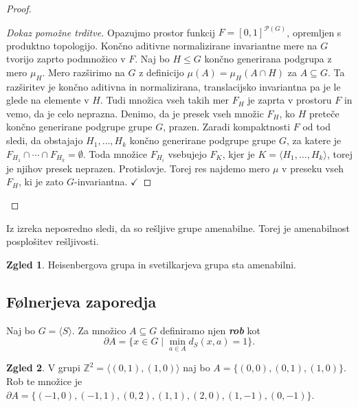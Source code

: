 \documentclass[11pt]{book}
\def\ZZ{\mathbb{Z}}
\def\PP{\mathcal{P}}
\def\definicija{\color{rdeca}\bf\em}
\def\kljuka{$\checkmark$}
\theoremstyle{definition}
\theoremstyle{zgled}
\newtheorem*{zgled}{Zgled}
\theoremstyle{odprtproblem}
\theoremstyle{domacanaloga}
\newenvironment{dokaz}
    {\color{siva}\begin{proof}}
    {\end{proof}}
\theoremstyle{izrek}
\begin{document}
\begin{dokaz}
\begin{dokaz}[Dokaz pomožne trditve]
Opazujmo prostor funkcij $F = [0,1]^{\PP(G)}$, opremljen s produktno topologijo. Končno aditivne normalizirane invariantne mere na $G$ tvorijo zaprto podmnožico v $F$. Naj bo $H \leq G$ končno generirana podgrupa z mero $\mu_H$. Mero razširimo na $G$ z definicijo $\mu(A) = \mu_H(A \cap H)$ za $A \subseteq G$. Ta razširitev je končno aditivna in normalizirana, translacijsko invariantna pa je le glede na elemente v $H$. Tudi množica vseh takih mer $F_H$ je zaprta v prostoru $F$ in vemo, da je celo neprazna. Denimo, da je presek vseh množic $F_H$, ko $H$ preteče končno generirane podgrupe grupe $G$, prazen. Zaradi kompaktnosti $F$ od tod sledi, da obstajajo $H_1, \dots, H_k$ končno generirane podgrupe grupe $G$, za katere je $F_{H_1} \cap \cdots \cap F_{H_k} = \emptyset$. Toda množice $F_{H_i}$ vsebujejo $F_K$, kjer je $K = \langle H_1, \dots, H_k \rangle$, torej je njihov presek neprazen. Protislovje. Torej res najdemo mero $\mu$ v preseku vseh $F_H$, ki je zato $G$-invariantna. \kljuka
\end{dokaz}

\end{dokaz}

Iz izreka neposredno sledi, da so rešljive grupe amenabilne. Torej je amenabilnost posplošitev rešljivosti.

\begin{zgled}
Heisenbergova grupa in svetilkarjeva grupa sta amenabilni.
\end{zgled}

\subsection{Følnerjeva zaporedja}

Naj bo $G = \langle S \rangle$. Za množico $A \subseteq G$ definiramo njen {\definicija rob} kot
\[
\partial A = \{ x \in G \mid \min_{a \in A} d_S(x,a) = 1 \}.
\]

\begin{zgled}
V grupi $\ZZ^2 = \langle (0,1), (1,0) \rangle$ naj bo $A = \{ (0,0), (0,1), (1,0) \}$. Rob te množice je $\partial A = \{ (-1, 0), (-1, 1), (0, 2), (1, 1), (2, 0), (1, -1), (0, -1) \}$.
\end{zgled}
\end{document}
